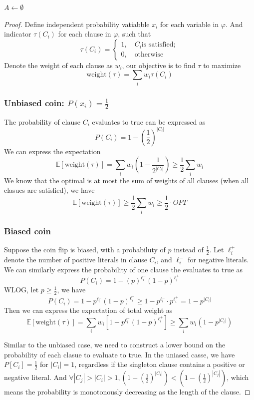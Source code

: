 \documentclass[10pt]{article}
\theoremstyle{definition}
\begin{document}
\begin{algorithm}[H]
$A \gets \emptyset$\;
\end{algorithm}
\begin{proof}
Define independent probability vatiabble $x_i$ for each variable in $\varphi$. And indicator $\tau(C_i)$ for each clause in $\varphi$, such that 
\[\tau(C_i) = \begin{cases}
  1, \quad C_i \text{is satisfied};\\
  0, \quad \text{otherwise}
\end{cases}\]
Denote the weight of each clause as $w_i$, our objective is to find $\tau$ to maximize
\[\text{weight}(\tau) = \sum_{i}w_i \tau(C_i)\]
\subsubsection*{Unbiased coin: $P(x_i) = \frac{1}{2}$}
The probability of clause $C_i$ 
evaluates to true can be expressed as 
\[P(C_i) = 1 - (\frac{1}{2})^{|C_i|}\]
We can express the expectation 
\[\mathbb{E}[\text{weight}(\tau)] = \sum_{i} w_i (1 - \frac{1}{2^{|C_i|}}) \geq \frac{1}{2}\sum_i w_i\]
We know that the optimal is at most the sum of weights of all clauses (when all clasues are satisfied), we have
\[\mathbb{E}[\text{weight}(\tau)] \geq \frac{1}{2}\sum_i w_i \geq \frac{1}{2}\cdot OPT\]


\subsubsection*{Biased coin}
Suppose the coin flip is biased, with a probabiluty of $p$ instead of $\frac{1}{2}$. Let $\ell^+_i$ denote the number of positive literals in clause $C_i$, and $\ell_i^-$ for negative literals. We can similarly express the probability of one clause the evaluates to true as
\[P(C_i) = 1 - (p)^{\ell^-_i}(1 - p)^{\ell^+_i}\]
WLOG, let $p \geq \frac{1}{2}$, we have 
\[P(C_i) = 1 - p^{\ell^-_i}(1 - p)^{\ell^+_i} \geq 1 - p^{\ell^-_i}\cdot p^{\ell^+_i} = 1 - p^{|C_i|}\]
Then we can express the expectation of total weight as
\[\mathbb{E}[\text{weight}(\tau)] = \sum_i w_i [1 - p^{\ell^-_i}(1 - p)^{\ell^+_i}] \geq \sum_i w_i (1 - p^{|C_i|})\]


Similar to the unbiased case, we need to construct a lower bound on the probability of each clasue to evaluate to true. 
In the uniased casse, we have $P[C_i] = \frac{1}{2}$ for $|C_i| = 1$, regardless if the singleton clause contains a positive or negative literal. 
And $\forall |C_j| > |C_i| > 1, (1 - (\frac{1}{2})^|C_i|) < (1 - (\frac{1}{2})^|C_j|)$, which means the probability is monotonously decreasing as the 
length of the clause. 


\end{proof}
\end{document}
